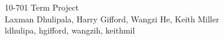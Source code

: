 \documentclass[11pt]{article}
\begin{document}
\medskip                        

\thispagestyle{plain}
\begin{center}                  %
{\Large 10-701 Term Project} \\
Laxman Dhulipala, Harry Gifford, Wangzi He, Keith Miller \\ ldhulipa, hgifford, wangzih, keithmil
\end{center}
\end{document}
